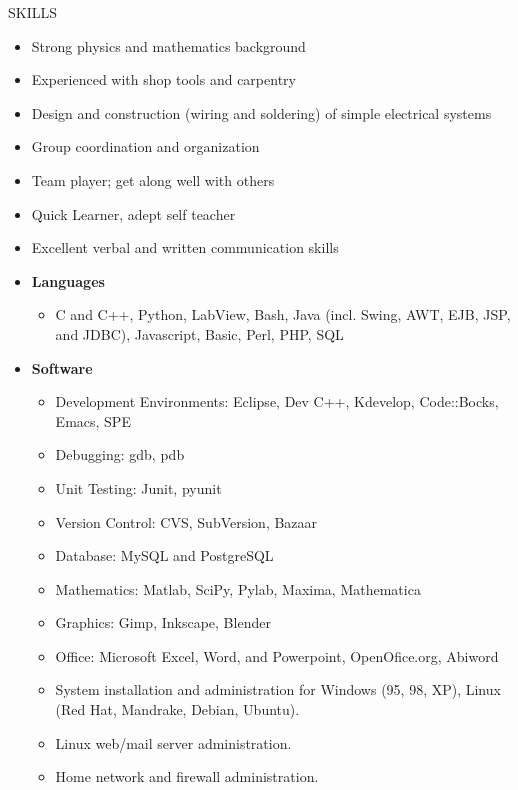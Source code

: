 \documentclass[11pt,oneside]{article}
\newenvironment{ressection}[1]{
	\vspace{4pt}
	{\fontfamily{phv}\selectfont\Large#1}
	\begin{itemize}
	\vspace{3pt}
}{
	\end{itemize}
}
\newcommand{\resitem}[1]{
	\vspace{-4pt}
	\item \begin{flushleft} #1 \end{flushleft}
}
\newcommand{\ressubitem}[1]{
	\vspace{-1pt}
	\item \begin{flushleft} #1 \end{flushleft}
}
\newenvironment{reslist}[1]{
	\resitem{\textbf{#1}}
	\vspace{-5pt}
	\begin{itemize}
}{
	\end{itemize}
}
\begin{document}
\begin{ressection}{SKILLS}
\resitem{Strong physics and mathematics background}
\resitem{Experienced with shop tools and carpentry}
\resitem{Design and construction (wiring and soldering) of simple electrical systems}
\resitem{Group coordination and organization}
\resitem{Team player; get along well with others}
\resitem{Quick Learner, adept self teacher}
\resitem{Excellent verbal and written communication skills}
    \begin{reslist}{ Languages}
    \ressubitem{C and C++, Python, LabView, Bash, Java (incl. Swing, AWT, EJB, JSP, and JDBC), Javascript, Basic, Perl, PHP, SQL}
    \end{reslist}
    \begin{reslist}{ Software}
\ressubitem{Development Environments: Eclipse, Dev C++, Kdevelop, Code::Bocks, Emacs, SPE}
\ressubitem{Debugging: gdb, pdb}
\ressubitem{Unit Testing: Junit, pyunit}
\ressubitem{Version Control: CVS, SubVersion, Bazaar}
\ressubitem{Database: MySQL and PostgreSQL}
\ressubitem{ Mathematics: Matlab, SciPy, Pylab, Maxima, Mathematica}
\ressubitem{ Graphics: Gimp, Inkscape, Blender}
\ressubitem{Office: Microsoft Excel, Word, and Powerpoint, OpenOfice.org, Abiword}
\ressubitem{System installation and administration for Windows (95, 98, XP), Linux (Red Hat, Mandrake, Debian, Ubuntu).}
\ressubitem{Linux web/mail server administration.}
\ressubitem{Home network and firewall administration.}
    \end{reslist}
\end{ressection}
\pagebreak
\end{document}
